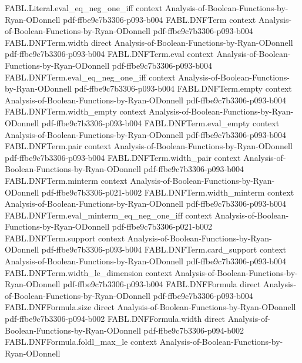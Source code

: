 \begin{theorem}
\proofstep
  {FABL.Literal.eval_eq_neg_one_iff}
  {context}
  {Analysis-of-Boolean-Functions-by-Ryan-ODonnell}
  {pdf-ffbe9c7b3306-p093-b004}
\proofstep
  {FABL.DNFTerm}
  {context}
  {Analysis-of-Boolean-Functions-by-Ryan-ODonnell}
  {pdf-ffbe9c7b3306-p093-b004}
\proofstep
  {FABL.DNFTerm.width}
  {direct}
  {Analysis-of-Boolean-Functions-by-Ryan-ODonnell}
  {pdf-ffbe9c7b3306-p093-b004}
\proofstep
  {FABL.DNFTerm.eval}
  {context}
  {Analysis-of-Boolean-Functions-by-Ryan-ODonnell}
  {pdf-ffbe9c7b3306-p093-b004}
\proofstep
  {FABL.DNFTerm.eval_eq_neg_one_iff}
  {context}
  {Analysis-of-Boolean-Functions-by-Ryan-ODonnell}
  {pdf-ffbe9c7b3306-p093-b004}
\proofstep
  {FABL.DNFTerm.empty}
  {context}
  {Analysis-of-Boolean-Functions-by-Ryan-ODonnell}
  {pdf-ffbe9c7b3306-p093-b004}
\proofstep
  {FABL.DNFTerm.width_empty}
  {context}
  {Analysis-of-Boolean-Functions-by-Ryan-ODonnell}
  {pdf-ffbe9c7b3306-p093-b004}
\proofstep
  {FABL.DNFTerm.eval_empty}
  {context}
  {Analysis-of-Boolean-Functions-by-Ryan-ODonnell}
  {pdf-ffbe9c7b3306-p093-b004}
\proofstep
  {FABL.DNFTerm.pair}
  {context}
  {Analysis-of-Boolean-Functions-by-Ryan-ODonnell}
  {pdf-ffbe9c7b3306-p093-b004}
\proofstep
  {FABL.DNFTerm.width_pair}
  {context}
  {Analysis-of-Boolean-Functions-by-Ryan-ODonnell}
  {pdf-ffbe9c7b3306-p093-b004}
\proofstep
  {FABL.DNFTerm.minterm}
  {context}
  {Analysis-of-Boolean-Functions-by-Ryan-ODonnell}
  {pdf-ffbe9c7b3306-p021-b002}
\proofstep
  {FABL.DNFTerm.width_minterm}
  {context}
  {Analysis-of-Boolean-Functions-by-Ryan-ODonnell}
  {pdf-ffbe9c7b3306-p093-b004}
\proofstep
  {FABL.DNFTerm.eval_minterm_eq_neg_one_iff}
  {context}
  {Analysis-of-Boolean-Functions-by-Ryan-ODonnell}
  {pdf-ffbe9c7b3306-p021-b002}
\proofstep
  {FABL.DNFTerm.support}
  {context}
  {Analysis-of-Boolean-Functions-by-Ryan-ODonnell}
  {pdf-ffbe9c7b3306-p093-b004}
\proofstep
  {FABL.DNFTerm.card_support}
  {context}
  {Analysis-of-Boolean-Functions-by-Ryan-ODonnell}
  {pdf-ffbe9c7b3306-p093-b004}
\proofstep
  {FABL.DNFTerm.width_le_dimension}
  {context}
  {Analysis-of-Boolean-Functions-by-Ryan-ODonnell}
  {pdf-ffbe9c7b3306-p093-b004}
\proofstep
  {FABL.DNFFormula}
  {direct}
  {Analysis-of-Boolean-Functions-by-Ryan-ODonnell}
  {pdf-ffbe9c7b3306-p093-b004}
\proofstep
  {FABL.DNFFormula.size}
  {direct}
  {Analysis-of-Boolean-Functions-by-Ryan-ODonnell}
  {pdf-ffbe9c7b3306-p094-b002}
\proofstep
  {FABL.DNFFormula.width}
  {direct}
  {Analysis-of-Boolean-Functions-by-Ryan-ODonnell}
  {pdf-ffbe9c7b3306-p094-b002}
\proofstep
  {FABL.DNFFormula.foldl_max_le}
  {context}
  {Analysis-of-Boolean-Functions-by-Ryan-ODonnell}

\end{theorem}
